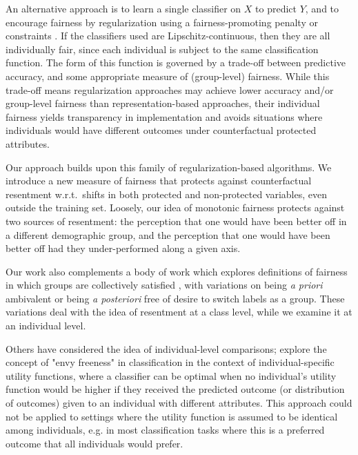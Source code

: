     An alternative approach is to learn a single classifier on $X$ to predict $Y$, and to encourage fairness by regularization using a fairness-promoting penalty \citep{KamAkaSak2011,KamAkHidSak2012,berk2017convex} or constraints \citep{zafar2017parity,zafar2017aistats,AgaBeyDudLanWal2018}. If the classifiers used are Lipschitz-continuous, then they are all individually fair, since each individual is subject to the same classification function. The form of this function is governed by a trade-off between predictive accuracy, and some appropriate measure of (group-level) fairness. While this trade-off means regularization approaches may achieve lower accuracy and/or group-level fairness than representation-based approaches, their individual fairness yields transparency in implementation and avoids situations where individuals would have different outcomes under counterfactual protected attributes.

    Our approach builds upon this family of regularization-based algorithms. We introduce a new measure of fairness that protects against counterfactual resentment w.r.t.\ shifts in both protected and non-protected variables, even outside the training set. Loosely, our idea of monotonic fairness protects against two sources of resentment: the perception that one would have been better off in a different demographic group, and the perception that one would have been better off had they under-performed along a given axis.

    Our work also complements a body of work which explores definitions of fairness in which groups are collectively satisfied \citep{zafar2017parity,heidari2018}, with variations on being \textit{a priori} ambivalent or being \textit{a posteriori} free of desire to switch labels as a group.  These variations deal with the idea of resentment at a class level, while we examine it at an individual level.  
    
    Others have considered the idea of individual-level comparisons; \cite{balcan2018} explore the concept of "envy freeness" in classification in the context of individual-specific utility functions, where a classifier can be optimal when no individual's utility function would be higher if they received the predicted outcome (or distribution of outcomes) given to an individual with different attributes. This approach could not be applied to settings where the utility function is assumed to be identical among individuals, e.g. in most classification tasks where this is a preferred outcome that all individuals would prefer.
    
